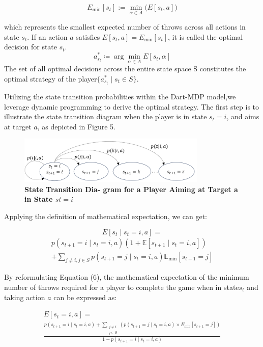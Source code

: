 \documentclass[cjjs]{ipart}
\theoremstyle{plain}
\begin{document}
\[
E_{\min}[s_t] := \min_{\alpha \in A} \big( E[s_t, a] \big)
\]

which represents the smallest expected number of throws across all actions in state $s_t$. If an action $a$ satisfies $E[s_t, a] = E_{\min}[s_t]$, it is called the optimal decision for state $s_t$.
\[
a_{s_t}^* \coloneqq \arg\min_{\alpha \in A} E[s_t, \alpha]
\]
The set of all optimal decisions across the entire state space S constitutes the optimal strategy of the player$\{ a_{s_t}^* \mid s_t \in S \}$.

Utilizing the state transition probabilities within the Dart-MDP model,we leverage dynamic programming to derive the optimal strategy. The first step is to illustrate the state transition diagram when the player is in state $s_t = i$, and aims at target $a$, as depicted in Figure 5.

\begin{figure}[h]
    \centering
    \includegraphics[width=0.80\textwidth]{5.png} 
    \caption{\textbf{State Transition Dia-
gram for a Player Aiming at Target a in State $st = i$}}
    \label{fig:dartboard}
\end{figure}

Applying the definition of mathematical expectation, we can get:

\[
E[s_t \mid s_t = i, a] =
\]
\begin{multline}
\tag{6}
p(s_{t+1} = i \mid s_t = i, a) \left( 1 + \mathbb{E}[s_{t+1} \mid s_t = i, a] \right) \\ 
+ \sum_{j \neq i, j \in S} p(s_{t+1} = j \mid s_t = i, a) \mathbb{E}_{\min}[s_{t+1} = j]
\end{multline}

By reformulating Equation (6), the mathematical expectation of the minimum number of throws required for a player to complete the game when in state$s_t$ and taking action $a$ can be expressed as:

\begin{multline}
\tag{7}
E[s_t = i, a] =\\
\frac{p(s_{t+1} = i \mid s_t = i, a) + \sum_{\substack{j \neq i \\ j \in S}} \left( p(s_{t+1} = j \mid s_t = i, a) \times E_{\min}[s_{t+1} = j] \right)}
{1 - p(s_{t+1} = i \mid s_t = i, a)}
\end{multline}
\end{document}

